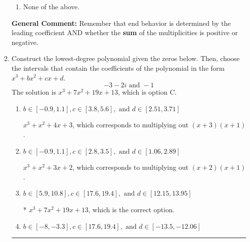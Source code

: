 \documentclass{extbook}[14pt]
\newcommand{\litem}[1]{\item #1

\rule{\textwidth}{0.4pt}}
\begin{document}
\begin{enumerate}
{\begin{enumerate}[label=\Alph*.]
\item None of the above.\end{enumerate}
\textbf{General Comment:} Remember that end behavior is determined by the leading coefficient AND whether the \textbf{sum} of the multiplicities is positive or negative.
}
\litem{
Construct the lowest-degree polynomial given the zeros below. Then, choose the intervals that contain the coefficients of the polynomial in the form $x^3+bx^2+cx+d$.
\[ -3 - 2 i \text{ and } -1 \]The solution is \( x^{3} +7 x^{2} +19 x + 13 \), which is option C.\begin{enumerate}[label=\Alph*.]
\item \( b \in [-0.9, 1.1], c \in [3.8, 5.6], \text{ and } d \in [2.51, 3.71] \)

$x^{3} + x^{2} +4 x + 3$, which corresponds to multiplying out $(x + 3)(x + 1)$.
\item \( b \in [-0.9, 1.1], c \in [2.8, 3.5], \text{ and } d \in [1.06, 2.89] \)

$x^{3} + x^{2} +3 x + 2$, which corresponds to multiplying out $(x + 2)(x + 1)$.
\item \( b \in [5.9, 10.8], c \in [17.6, 19.4], \text{ and } d \in [12.15, 13.95] \)

* $x^{3} +7 x^{2} +19 x + 13$, which is the correct option.
\item \( b \in [-8, -3.3], c \in [17.6, 19.4], \text{ and } d \in [-13.5, -12.06] \)


\end{enumerate}}
\end{enumerate}
\end{document}
